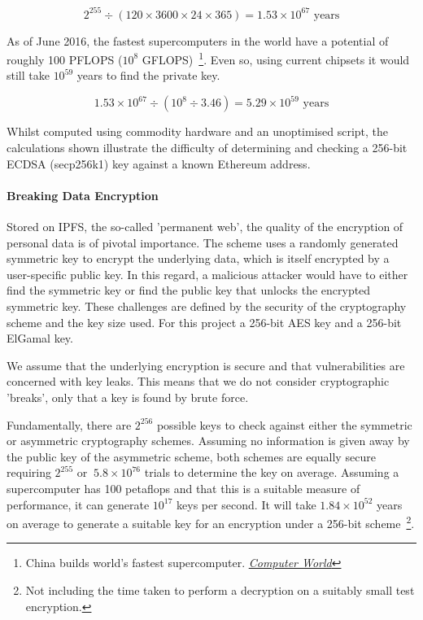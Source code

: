$$
2^{255} \div (120 \times 3600 \times 24 \times 365) = 1.53 \times 10^{67} \text{ years}
$$

As of June 2016, the fastest supercomputers in the world have a potential of roughly 100 PFLOPS ($10^8$ GFLOPS)~\footnote{China builds world's fastest supercomputer.  \href{http://www.computerworld.com/article/3085483/high-performance-computing/china-builds-world-s-fastest-supercomputer-without-u-s-chips.html}{\textit{Computer World}}}. Even so, using current chipsets it would still take $10^{59}$ years to find the private key.

$$
1.53 \times 10^{67} \div (10^8 \div 3.46) = 5.29 \times 10^{59} \text{ years}
$$

Whilst computed using commodity hardware and an unoptimised script, the calculations shown illustrate the difficulty of determining and checking a 256-bit ECDSA (secp256k1) key against a known Ethereum address.

\paragraph{Breaking Data Encryption}

Stored on IPFS, the so-called 'permanent web', the quality of the encryption of personal data is of pivotal importance. The scheme uses a randomly generated symmetric key to encrypt the underlying data, which is itself encrypted by a user-specific public key. In this regard, a malicious attacker would have to either find the symmetric key or find the public key that unlocks the encrypted symmetric key. These challenges are defined by the security of the cryptography scheme and the key size used. For this project a 256-bit AES key and a 256-bit ElGamal key.

We assume that the underlying encryption is secure and that vulnerabilities are concerned with key leaks. This means that we do not consider cryptographic 'breaks', only that a key is found by brute force.

Fundamentally, there are $2^{256}$ possible keys to check against either the symmetric or asymmetric cryptography schemes. Assuming no information is given away by the public key of the asymmetric scheme, both schemes are equally secure requiring $2^{255}$ or $~5.8 \times 10^{76}$ trials to determine the key on average. Assuming a supercomputer has 100 petaflops and that this is a suitable measure of performance, it can generate $10^{17}$ keys per second. It will take $1.84 \times 10^{52}$ years on average to generate a suitable key for an encryption under a 256-bit scheme~\footnote{Not including the time taken to perform a decryption on a suitably small test encryption.}.

